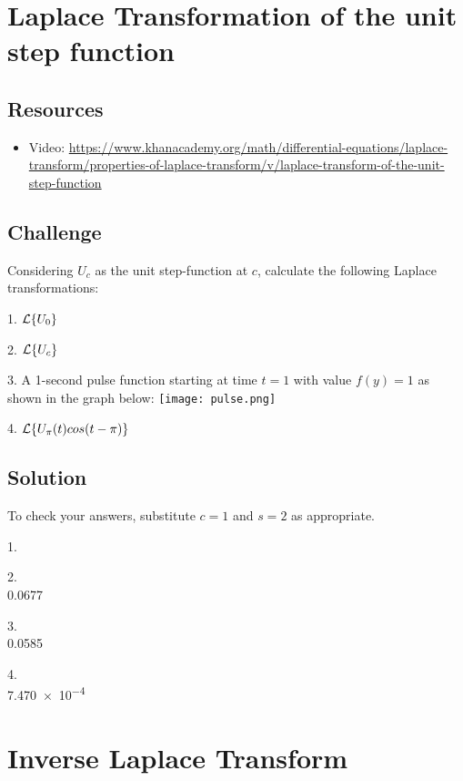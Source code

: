 \newpage
\section{Laplace Transformation of the unit step function}

\subsection*{Resources}
\begin{itemize}
    \item Video: \url{https://www.khanacademy.org/math/differential-equations/laplace-transform/properties-of-laplace-transform/v/laplace-transform-of-the-unit-step-function} %
\end{itemize}

\subsection*{Challenge}
Considering $U_c$ as the unit step-function at $c$, calculate the following Laplace transformations:

1. $\displaystyle \mathcal{L}\{U_0\}$

2. $\displaystyle \mathcal{L}\{U_c\}$

3. A 1-second pulse function starting at time $t=1$ with value $f(y)=1$ as shown in the graph below:
\texttt{[image: pulse.png]}

4. $\displaystyle \mathcal{L}\{U_\pi(t) cos(t-\pi)\}$

\subsection*{Solution}
To check your answers, substitute $c=1$ and $s=2$ as appropriate.

1.\\

2.\\
0.0677

3.\\
0.0585

4.\\
\num{7.470e-4}




\newpage
\section{Inverse Laplace Transform}

